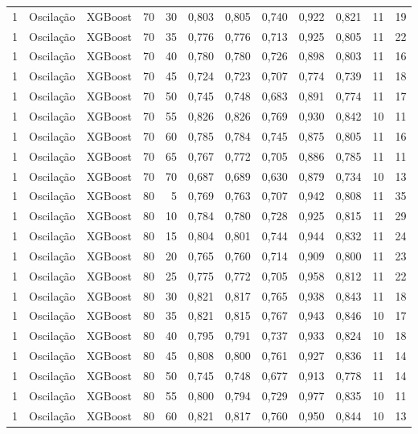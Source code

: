 \begin{longtable}{@{}rllrrrrrrrrr@{}}
1 & Oscilação & XGBoost & 70 & 30 & 0,803 & 0,805 & 0,740 & 0,922 & 0,821 & 11 & 19 \\
1 & Oscilação & XGBoost & 70 & 35 & 0,776 & 0,776 & 0,713 & 0,925 & 0,805 & 11 & 22 \\
1 & Oscilação & XGBoost & 70 & 40 & 0,780 & 0,780 & 0,726 & 0,898 & 0,803 & 11 & 16 \\
1 & Oscilação & XGBoost & 70 & 45 & 0,724 & 0,723 & 0,707 & 0,774 & 0,739 & 11 & 18 \\
1 & Oscilação & XGBoost & 70 & 50 & 0,745 & 0,748 & 0,683 & 0,891 & 0,774 & 11 & 17 \\
1 & Oscilação & XGBoost & 70 & 55 & 0,826 & 0,826 & 0,769 & 0,930 & 0,842 & 10 & 11 \\
1 & Oscilação & XGBoost & 70 & 60 & 0,785 & 0,784 & 0,745 & 0,875 & 0,805 & 11 & 16 \\
1 & Oscilação & XGBoost & 70 & 65 & 0,767 & 0,772 & 0,705 & 0,886 & 0,785 & 11 & 11 \\
1 & Oscilação & XGBoost & 70 & 70 & 0,687 & 0,689 & 0,630 & 0,879 & 0,734 & 10 & 13 \\
1 & Oscilação & XGBoost & 80 & 5 & 0,769 & 0,763 & 0,707 & 0,942 & 0,808 & 11 & 35 \\
1 & Oscilação & XGBoost & 80 & 10 & 0,784 & 0,780 & 0,728 & 0,925 & 0,815 & 11 & 29 \\
1 & Oscilação & XGBoost & 80 & 15 & 0,804 & 0,801 & 0,744 & 0,944 & 0,832 & 11 & 24 \\
1 & Oscilação & XGBoost & 80 & 20 & 0,765 & 0,760 & 0,714 & 0,909 & 0,800 & 11 & 23 \\
1 & Oscilação & XGBoost & 80 & 25 & 0,775 & 0,772 & 0,705 & 0,958 & 0,812 & 11 & 22 \\
1 & Oscilação & XGBoost & 80 & 30 & 0,821 & 0,817 & 0,765 & 0,938 & 0,843 & 11 & 18 \\
1 & Oscilação & XGBoost & 80 & 35 & 0,821 & 0,815 & 0,767 & 0,943 & 0,846 & 10 & 17 \\
1 & Oscilação & XGBoost & 80 & 40 & 0,795 & 0,791 & 0,737 & 0,933 & 0,824 & 10 & 18 \\
1 & Oscilação & XGBoost & 80 & 45 & 0,808 & 0,800 & 0,761 & 0,927 & 0,836 & 11 & 14 \\
1 & Oscilação & XGBoost & 80 & 50 & 0,745 & 0,748 & 0,677 & 0,913 & 0,778 & 11 & 14 \\
1 & Oscilação & XGBoost & 80 & 55 & 0,800 & 0,794 & 0,729 & 0,977 & 0,835 & 10 & 11 \\
1 & Oscilação & XGBoost & 80 & 60 & 0,821 & 0,817 & 0,760 & 0,950 & 0,844 & 10 & 13 \\

\end{longtable}
